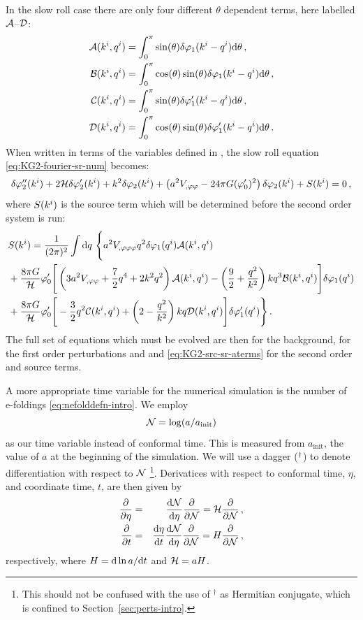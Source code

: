 In the slow roll case there are only four different $\theta$ dependent terms,
here labelled $\mathcal{A}$--$\mathcal{D}$:
%
\begin{align}
\label{eq:AtoD-num}
 \mathcal{A}(k^i,q^i) &= \int_0^\pi \sin(\theta) \delta\varphi_{1}(k^i-q^i) \mathrm{d}\theta \,,
\nonumber\\
 \mathcal{B}(k^i,q^i) &= \int_0^\pi \cos(\theta)\sin(\theta) \delta\varphi_{1}(k^i-q^i)
\mathrm{d}\theta \,,\nonumber\\
 \mathcal{C}(k^i,q^i) &= \int_0^\pi \sin(\theta) \delta\varphi_{1}'(k^i-q^i) \mathrm{d}\theta \,,
\nonumber\\
 \mathcal{D}(k^i,q^i) &= \int_0^\pi \cos(\theta) \sin(\theta) \delta\varphi_{1}'(k^i-q^i)
\mathrm{d}\theta \,.
\end{align}
%
When written in terms of the variables defined in ,
the slow roll equation
\eqref{eq:KG2-fourier-sr-num} becomes:
%
\begin{equation}
\label{eq:KG2-fourier-sr-aterms}
\delta\varphi_{2}''(k^i)+2\mathcal{H}\delta\varphi_{2}'(k^i)+k^2\delta\varphi_{2}(k^i)
+\left(a^2
V_{,\varphi\varphi}-{24 \pi G}(\varphi_{0}')^2\right)
\delta\varphi_{2}(k^i)
+ S(k^i) = 0 \,,
\end{equation}
%
where $S(k^i)$ is the source term which will be determined before the
second order system is run:
\begin{align}
\label{eq:KG2-src-sr-aterms}
&S(\kvi) = \frac{1}{(2\pi)^2}\int \d q\ \Bigg\{
a^2\Uppp q^2 \dvp1(\qvi) \A(\kvi,\qvi) \nonumber\\
&+ \frac{8\pi G}{\H}\vp_{0}' \Bigg[ 
\left( 3a^2\Upp + \frac{7}{2}q^4 + 2k^2q^2\right) \A(\kvi,\qvi)
-\left(\frac{9}{2} + \frac{q^2}{k^2}\right)kq^3 \B(\kvi,\qvi)
\Bigg]\dvp1(\qvi) \nonumber\\
%
&+ \frac{8\pi G}{\H}\vp_{0}' \Bigg[
-\frac{3}{2}q^2 \C(\kvi,\qvi) + \left(2-\frac{q^2}{k^2}\right)kq \D(\kvi,\qvi) 
\Bigg]\dvp1'(\qvi) \Bigg\} \,.
%
\end{align}
%
 The full set of equations which must be evolved are
then  for the background,  for the first
order perturbations and  and
\eqref{eq:KG2-src-sr-aterms} for the second order and source terms.


A more appropriate time variable for the numerical simulation is the
number of e-foldings \eqref{eq:nefolddefn-intro}. We employ 
%
\begin{equation}
\label{eq:def-ntime}
\mathcal{N} = \log ( a / a_{\mathrm{init}} )
\end{equation}
%
as our time variable instead of conformal time. This is measured from
$a_{\mathrm{init}}$, the value of $a$ at the beginning of the
simulation. We will use a dagger ($^{\dagger}$) to denote
differentiation with respect to $\mathcal{N}$ \footnote{This should not be confused
with the use of $^\dagger$ as Hermitian conjugate, which is confined to
Section~\ref{sec:perts-intro}.}.
% 
Derivatices with respect to conformal time, $\eta$, and coordinate time, $t$, are
then given by
%
\begin{eqnarray}
 \frac{\partial  }{\partial \eta} &=& \frac{\mathrm{d} \mathcal{N}}{\mathrm{d} \eta}\frac{\partial }{\partial \mathcal{N}} = \mathcal{H} \frac{\partial }{\partial \mathcal{N}} \,,\\
 \frac{\partial  }{\partial t} &=& \frac{\mathrm{d} \eta}{\mathrm{d} t} \frac{\mathrm{d} \mathcal{N}}{\mathrm{d} \eta}\frac{\partial }{\partial \mathcal{N}} = H
\frac{\partial }{\partial \mathcal{N}}\,,
\end{eqnarray}
%
respectively, where $H = \mathrm{d} \ln a/\mathrm{d} t$ and $\mathcal{H} = aH$.
% 

